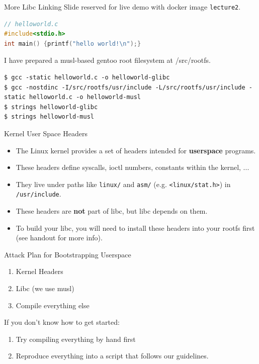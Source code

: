 \documentclass{../lecture}
\begin{document}
\begin{frame}[fragile]{More Libc Linking}
  Slide reserved for live demo with docker image \texttt{lecture2}.
\begin{lstlisting}[language=c]
// helloworld.c
#include<stdio.h>
int main() {printf("hello world!\n");}
\end{lstlisting}
I have prepared a musl-based gentoo root filesystem at /src/rootfs.
\begin{lstlisting}
$ gcc -static helloworld.c -o helloworld-glibc
$ gcc -nostdinc -I/src/rootfs/usr/include -L/src/rootfs/usr/include -static helloworld.c -o helloworld-musl
$ strings helloworld-glibc
$ strings helloworld-musl
\end{lstlisting}
\end{frame}

\begin{frame}{Kernel User Space Headers}
\begin{itemize}
  \item The Linux kernel provides a set of headers intended for \textbf{userspace}
        programs.
  \item These headers define syscalls, ioctl numbers, constants within the
    kernel, ...
  \item They live under paths like \texttt{linux/} and \texttt{asm/} (e.g.
      \texttt{<linux/stat.h>}) in \texttt{/usr/include}.
  \item These headers are \textbf{not} part of libc, but libc depends on them.
  \item To build your libc, you will need to install these headers into your
    rootfs first (see handout for more info).
\end{itemize}
\end{frame}

\begin{frame}{Attack Plan for Bootstrapping Userspace}
  \begin{enumerate}
    \item Kernel Headers
    \item Libc (we use musl)
    \item Compile everything else
  \end{enumerate}
  If you don't know how to get started:
  \begin{enumerate}
    \item Try compiling everything by hand first
    \item Reproduce everything into a script that follows our guidelines.
  \end{enumerate}
\end{frame}
\end{document}
